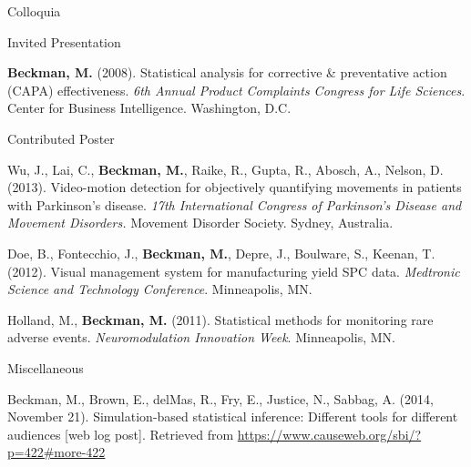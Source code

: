 \documentclass{resume} %
\begin{document}
\begin{rSection}{Colloquia}
\begin{rSubsection}{Invited Presentation}{}{}{}
		\item[] \textbf{Beckman, M.} (2008). Statistical analysis for corrective \& preventative action (CAPA) effectiveness. \textit{6th Annual Product Complaints Congress for Life Sciences}. Center for Business Intelligence. Washington, D.C. \vspace{0.5em}

			
	\end{rSubsection}	

		
		

	
	\begin{rSubsection}{Contributed Poster}{}{}{}
		
		\item[] Wu, J., Lai, C., \textbf{Beckman, M.}, Raike, R., Gupta, R., Abosch, A., Nelson, D. (2013). Video-motion detection for objectively quantifying movements in patients with Parkinson's disease. \textit{17th International Congress of Parkinson's Disease and Movement Disorders.} Movement Disorder Society. Sydney, Australia. \vspace{0.5em}
		
		\item[] Doe, B., Fontecchio, J., \textbf{Beckman, M.}, Depre, J., Boulware, S., Keenan, T. (2012). Visual management system for manufacturing yield SPC data. \textit{Medtronic Science and Technology Conference}. Minneapolis, MN. \vspace{0.5em}
		
		\item[] Holland, M., \textbf{Beckman, M.} (2011). Statistical methods for monitoring rare adverse events. \textit{Neuromodulation Innovation Week}. Minneapolis, MN.   \vspace{0.5em}
		
	\end{rSubsection}

	\begin{rSubsection}{Miscellaneous}{}{}{}
		
		\item[] Beckman, M., Brown, E., delMas, R., Fry, E., Justice, N., Sabbag, A. (2014, November 21). Simulation-based statistical inference: Different tools for different audiences [web log post]. Retrieved from \url{https://www.causeweb.org/sbi/?p=422#more-422} \vspace{0.5em}
		
		
	\end{rSubsection}
	
	
	
\end{rSection}
\end{document}
